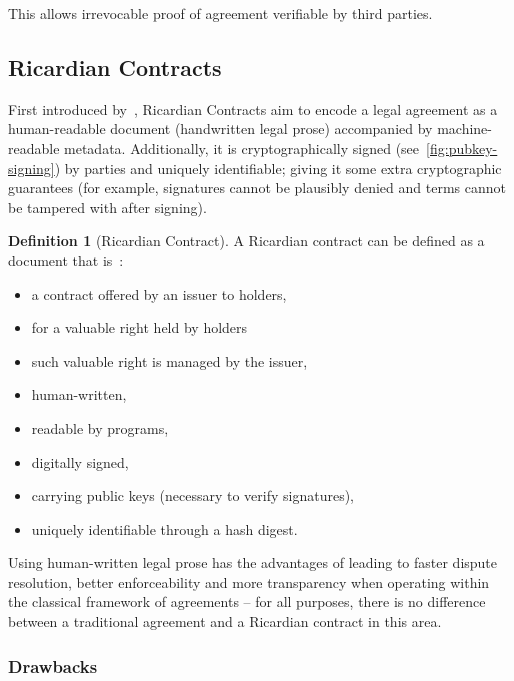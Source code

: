 This allows irrevocable proof of agreement verifiable by third parties.

\subsection{Ricardian Contracts}\label{subsec:ricardian-contracts}

First introduced by~\cite{grigg2004ricardian, ricardianWeb}, Ricardian Contracts aim to encode a legal agreement as a human-readable document (handwritten legal prose) accompanied by machine-readable metadata.
Additionally, it is cryptographically signed (see~\ref{fig:pubkey-signing}) by parties and uniquely identifiable;
giving it some extra cryptographic guarantees (for example, signatures cannot be plausibly denied and terms cannot be tampered with after signing).

\theoremstyle{definition}
\newtheorem{definition}{Definition}

\begin{definition}[Ricardian Contract]
    \label{def:ricardian}
    A Ricardian contract can be defined as a document that is~\cite[]{grigg2004ricardian}:
    \begin{itemize}
        \item a contract offered by an issuer to holders,
        \item for a valuable right held by holders
        \item such valuable right is managed by the issuer,
        \item human-written,
        \item readable by programs,
        \item digitally signed,
        \item carrying public keys (necessary to verify signatures),
        \item uniquely identifiable through a hash digest.
    \end{itemize}
\end{definition}

Using human-written legal prose has the advantages of leading to faster dispute resolution, better enforceability and more transparency when operating within the classical framework of agreements -- for all purposes, there is no difference between a traditional agreement and a Ricardian contract in this area.\\

\subsubsection{Drawbacks}

